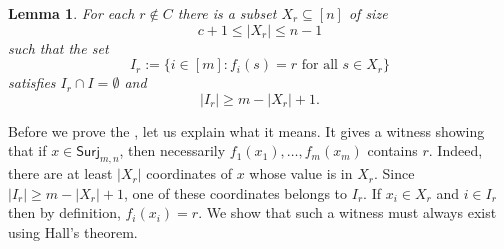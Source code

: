 \documentclass{article}
\providecommand{\Surj}{\mathsf{Surj}}
\newtheorem{lemma}[theorem]{Lemma}
\theoremstyle{definition}
\theoremstyle{remark}
\begin{document}
\begin{lemma}
\label{lem:hall}
For each $r \notin C$ there is a subset $X_r \subseteq [n]$ of size
\[
 c + 1 \le |X_r| \leq n - 1
\]
such that the set
\[
 I_r := \{ i \in [m] : f_i(s) = r \text{ for all } s \in X_r \}
\]
satisfies $I_r \cap I = \emptyset$ and
\[
 |I_r| \ge m - |X_r| + 1.
\]
\end{lemma}

Before we prove the , let us explain what it means. It gives a witness showing that if $x \in \Surj_{m,n}$, then necessarily $f_1(x_1),\dots,f_m(x_m)$ contains $r$. Indeed, there are at least $|X_r|$ coordinates of $x$ whose value is in $X_r$. Since $|I_r| \ge m - |X_r| + 1$, one of these coordinates belongs to $I_r$. If $x_i \in X_r$ and $i \in I_r$ then by definition, $f_i(x_i) = r$.
We show that such a witness must always exist using Hall's theorem.
\end{document}

